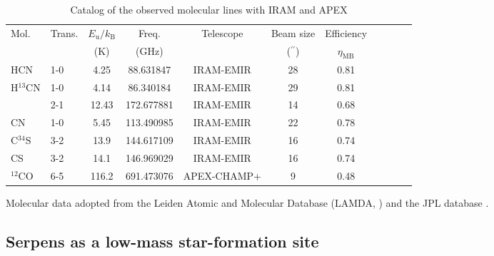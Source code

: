 \documentclass{aa}
\begin{document}
\begin{table*} 
\caption{Catalog of the observed molecular lines with IRAM and APEX \label{table:lines}}          
\centering                        
\begin{tabular}{l l c c c c c c c c c }
\hline \hline                 
 Mol. & Trans. & $E_\mathrm{u}/k_\mathrm{B}$ & Freq. & Telescope  & Beam size & Efficiency  \\
  &  & (K) & (GHz)  &  &($^{\prime\prime}$) & $\eta_\mathrm{MB}$\\ 
\hline                        %
HCN & 1-0 & 4.25 & 88.631847 & IRAM-EMIR  & 28 & 0.81 \\ 
H$^{13}$CN & 1-0 & 4.14 & 86.340184 & IRAM-EMIR & 29 & 0.81 \\ 
~ & 2-1 & 12.43 & 172.677881 & IRAM-EMIR & 14 & 0.68 \\ 
CN & 1-0  & 5.45 & 113.490985 & IRAM-EMIR  & 22 & 0.78 \\ 
C$^{34}$S & 3-2 &  13.9 & 144.617109 & IRAM-EMIR & 16 & 0.74 \\
CS & 3-2 &  14.1 & 146.969029 & IRAM-EMIR & 16 & 0.74 \\ 
$^{12}$CO & 6-5 & 116.2 &  691.473076 & APEX-CHAMP+ & 9 & 0.48 \\
\hline 
\end{tabular} 
\begin{flushleft} 
Molecular data adopted from the Leiden Atomic and Molecular Database (LAMDA, \citealt{Sch05})
and the JPL database \citep{Pic98}.
\end{flushleft} 
\end{table*}
\subsection{Serpens as a low-mass star-formation site}
\end{document}
